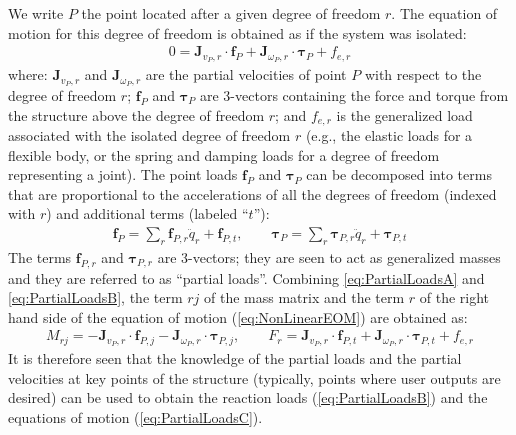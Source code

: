 \documentclass[wes, manuscript]{copernicus}
\renewcommand{\v}[1]{\boldsymbol{#1}}
\newcommand{\m}[1]{\boldsymbol{#1}}
\begin{document}
We write $P$ the point located after a given degree of freedom $r$. The equation of motion for this degree of freedom is obtained as if the system was isolated:
\begin{align}
   0 = \m{J}_{v_P,r} \cdot \v{f}_P + \m{J}_{\omega_P,r} \cdot \v{\tau}_P + f_{e,r}
    \label{eq:PartialLoadsA}
\end{align}
where: $\m{J}_{v_P,r}$ and $\m{J}_{\omega_P,r}$ are the partial velocities of point $P$ with respect to the degree of freedom $r$;  $\v{f}_P$ and $\v{\tau}_P$ are 3-vectors containing the force and torque from the structure above the degree of freedom $r$; and $f_{e,r}$ is the generalized load associated with the isolated degree of freedom $r$ (e.g., the elastic loads for a flexible body, or the spring and damping loads for a degree of freedom representing a joint).  
The point loads $\v{f}_P$ and $\v{\tau}_P$ can be decomposed into terms that are proportional to the accelerations of all the degrees of freedom (indexed with $r$) and additional terms (labeled ``$t$''):
\begin{align}
\v{f}_P = \sum_r  \v{f}_{P,r} \ddot{q}_r + \v{f}_{P,t}
    ,\qquad
\v{\tau}_P = \sum_r  \v{\tau}_{P,r} \ddot{q}_r + \v{\tau}_{P,t}
    \label{eq:PartialLoadsB}
\end{align}
The terms $\v{f}_{P,r}$ and $\v{\tau}_{P,r}$ are 3-vectors; they are seen to act as generalized masses and they are referred to as ``partial loads''. 
% 
Combining \autoref{eq:PartialLoadsA} and \autoref{eq:PartialLoadsB}, the term $rj$ of the mass matrix and the term $r$ of the right hand side of the equation of motion (\autoref{eq:NonLinearEOM}) are obtained as:
\begin{align}
  M_{rj} =
     - \m{J}_{v_P,r} \cdot \v{f}_{P,j}  
     - \m{J}_{\omega_P,r} \cdot \v{\tau}_{P,j}
      ,\qquad
    F_r =  \m{J}_{v_P,r}\cdot\v{f}_{P,t} + \m{J}_{\omega_P,r} \cdot \v{\tau}_{P,t} + f_{e,r}
      \label{eq:PartialLoadsC}
\end{align}
It is therefore seen that the knowledge of the partial loads and the partial velocities at key points of the structure (typically, points where user outputs are desired) can be used to obtain the reaction loads (\autoref{eq:PartialLoadsB}) and the equations of motion (\autoref{eq:PartialLoadsC}).
\end{document}

